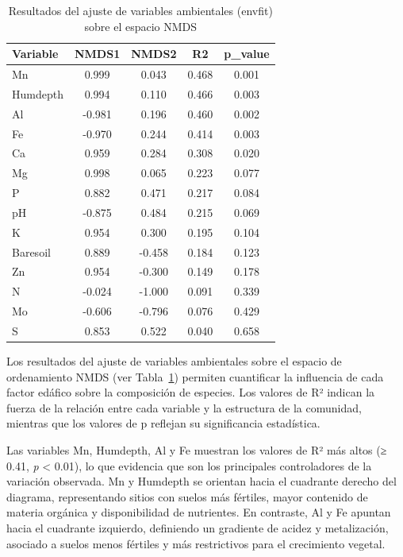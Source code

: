 \documentclass[
  spanish,
  11pt,
  a4paper,
  DIV=11,
  numbers=noendperiod]{scrartcl}
\begin{document}
\begin{longtable}[]{@{}lcccc@{}}

\caption{\label{tbl-nmds-envfit}Resultados del ajuste de variables
ambientales (envfit) sobre el espacio NMDS}

\tabularnewline

\toprule\noalign{}
Variable & NMDS1 & NMDS2 & R2 & p\_value \\
\midrule\noalign{}
\endhead
\bottomrule\noalign{}
\endlastfoot
Mn & 0.999 & 0.043 & 0.468 & 0.001 \\
Humdepth & 0.994 & 0.110 & 0.466 & 0.003 \\
Al & -0.981 & 0.196 & 0.460 & 0.002 \\
Fe & -0.970 & 0.244 & 0.414 & 0.003 \\
Ca & 0.959 & 0.284 & 0.308 & 0.020 \\
Mg & 0.998 & 0.065 & 0.223 & 0.077 \\
P & 0.882 & 0.471 & 0.217 & 0.084 \\
pH & -0.875 & 0.484 & 0.215 & 0.069 \\
K & 0.954 & 0.300 & 0.195 & 0.104 \\
Baresoil & 0.889 & -0.458 & 0.184 & 0.123 \\
Zn & 0.954 & -0.300 & 0.149 & 0.178 \\
N & -0.024 & -1.000 & 0.091 & 0.339 \\
Mo & -0.606 & -0.796 & 0.076 & 0.429 \\
S & 0.853 & 0.522 & 0.040 & 0.658 \\

\end{longtable}

Los resultados del ajuste de variables ambientales sobre el espacio de
ordenamiento NMDS (ver Tabla~\ref{tbl-nmds-envfit}) permiten cuantificar
la influencia de cada factor edáfico sobre la composición de especies.
Los valores de R² indican la fuerza de la relación entre cada variable y
la estructura de la comunidad, mientras que los valores de p reflejan su
significancia estadística.

Las variables Mn, Humdepth, Al y Fe muestran los valores de R² más altos
(≥ 0.41, \emph{p} \textless{} 0.01), lo que evidencia que son los
principales controladores de la variación observada. Mn y Humdepth se
orientan hacia el cuadrante derecho del diagrama, representando sitios
con suelos más fértiles, mayor contenido de materia orgánica y
disponibilidad de nutrientes. En contraste, Al y Fe apuntan hacia el
cuadrante izquierdo, definiendo un gradiente de acidez y metalización,
asociado a suelos menos fértiles y más restrictivos para el crecimiento
vegetal.
\end{document}
